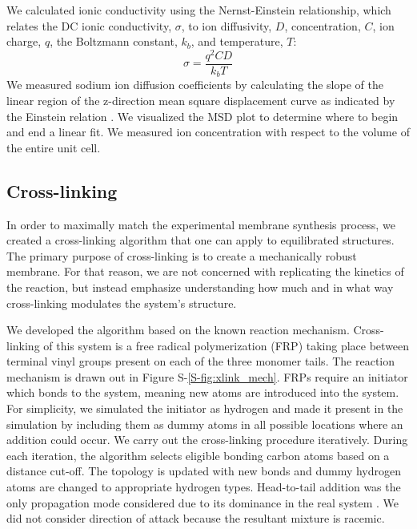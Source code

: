 \documentclass[journal=jpcbfk,manusciprt=article]{achemso}
\begin{document}
  We calculated ionic conductivity using the Nernst-Einstein relationship, which 
  relates the DC ionic conductivity, $\sigma$, to ion diffusivity, $D$, 
  concentration, $C$, ion charge, $q$, the Boltzmann constant, $k_b$, and 
  temperature, $T$: 
  \begin{equation}
	\sigma = \dfrac{q^2CD}{k_b T} 
	\label{eqn:nernst_einstein}
  \end{equation}
  We measured sodium ion diffusion coefficients by calculating the slope
  of the linear region of the z-direction mean square displacement curve as
  indicated by the Einstein relation \cite{einstein_investigations_1956}. We
  visualized the MSD plot to determine where to begin and end a linear fit. We
  measured ion concentration with respect to the volume of the entire unit cell. 
  
  \subsection{Cross-linking}
  
  In order to maximally match the experimental membrane synthesis process,
  we created a cross-linking algorithm that one can apply to equilibrated structures. 
  The primary purpose of cross-linking is to create a mechanically robust membrane.
  For that reason, we are not concerned with replicating the kinetics of the reaction, 
  but instead emphasize understanding how much and in what way cross-linking modulates
  the system's structure.


  We developed the algorithm based on the known reaction mechanism.
  Cross-linking of this system is a free radical polymerization (FRP) taking
  place between terminal vinyl groups present on each of the three monomer tails.
  The reaction mechanism is drawn out in Figure S-\ref{S-fig:xlink_mech}.
  FRPs require an initiator which bonds to the system, meaning new atoms are
  introduced into the system. For simplicity, we simulated the initiator as
  hydrogen and made it present in the simulation by including them as dummy atoms
  in all possible locations where an addition could occur. We carry out the
  cross-linking procedure iteratively. During each iteration, the algorithm
  selects eligible bonding carbon atoms based on a distance cut-off. The topology
  is updated with new bonds and dummy hydrogen atoms are changed to appropriate
  hydrogen types.  Head-to-tail addition was the only propagation mode considered
  due to its dominance in the real system \cite{young_introduction_2011}. We did
  not consider direction of attack because the resultant mixture is racemic.
\end{document}
